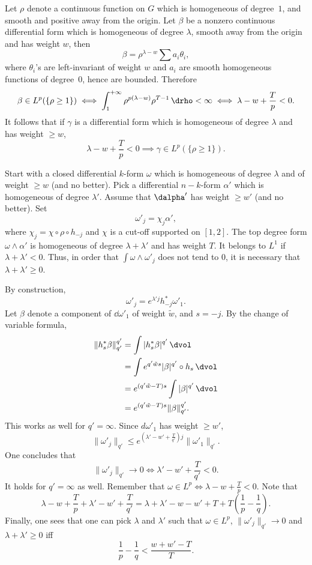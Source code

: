 Let $\rho$ denote a continuous function on $G$ which is homogeneous of degree~$1$, and smooth and positive away from the origin. Let $\beta$ be a nonzero continuous differential form which is homogeneous of degree $\lambda$, smooth away from the origin and has weight $w$, then
\[
\beta=\rho^{\lambda-w}\sum a_i\theta_i,
\]
where $\theta_i$'s are left-invariant of weight $w$ and $a_i$ are smooth homogeneous functions of degree~$0$, hence are bounded. Therefore
\[
\beta\in L^p(\{\rho\geq 1\}) \iff
\int_{1}^{+\infty}\rho^{p(\lambda-w)}\rho^{T-1}\, \drho<\infty
\iff \lambda-w +\frac{T}{p}<0.
\]
It follows that if $\gamma$ is a differential form which is homogeneous of degree $\lambda$ and has weight $\geq w$,
\begin{equation}\label{eq:16}
\lambda-w +\frac{T}{p}<0 \implies \gamma\in L^p(\{\rho\geq 1\}).
\end{equation}

Start with a closed differential $k$-form $\omega$ which is homogeneous of degree $\lambda$ and of weight $\geq w$ (and no better). Pick a differential $n-k$-form $\alpha'$ which is homogeneous of degree $\lambda'$. Assume that $\dalpha'$ has weight $\geq w'$ (and no better). Set
\[
\omega'_j=\chi_j \alpha',
\]
where $\chi_j=\chi\circ\rho\circ h_{-j}$ and $\chi$ is a cut-off supported on $[1,2]$. The top degree form $\omega\wedge \alpha'$ is homogeneous of degree $\lambda+\lambda'$ and has weight $T$. It belongs to $L^1$ if $\lambda+\lambda'<0$. Thus, in order that $\int\omega\wedge \omega'_j$ does not tend to $0$, it is necessary that $\lambda+\lambda'\geq 0$.

By construction,
\[
\omega'_j=e^{\lambda'j} h_{-j}^*\omega'_1.
\]
Let $\beta$ denote a component of $\dd\omega'_1$ of weight $\tilde w$, and $s=-j$. By the change of variable formula,
\begin{align*}
\| h_s^*\beta\|_{q'}^{q'} &= \int | h_s^*\beta|^{q'}\,\dvol\\
&= \int e^{q'{\tilde w}s}|\beta|^{q'}\circ h_s\,\dvol\\
&= e^{(q'{\tilde w}-T)s}\int |\beta|^{q'}\,\dvol\\
&= e^{(q'{\tilde w}-T)s}\|\beta\|_{q'}^{q'}.
\end{align*}
This works as well for $q'=\infty$. Since $d\omega'_1$ has weight $\geq w'$,
\[
\|\omega'_j\|_{q'}\leq e^{(\lambda'-w'+\frac{T}{q'})j}\|\omega'_1\|_{q'}.
\]
One concludes that
\[
\|\omega'_j\|_{q'}\to 0 \iff \lambda'-w'+\frac{T}{q'}<0.
\]
It holds for $q'=\infty$ as well. Remember that $\omega\in L^p \iff \lambda-w+\frac{T}{p}<0$. Note that
\[
\lambda-w+\frac{T}{p}+\lambda'-w'+\frac{T}{q'} =\lambda+\lambda'-w-w'+T+T\left(\frac{1}{p}-\frac{1}{q}\right).
\]
Finally, one sees that one can pick $\lambda$ and $\lambda'$ such that $\omega\in L^p$, $\|\omega'_j\|_{q'}\to 0$ and $\lambda+\lambda'\geq 0$ iff
\begin{equation}\label{eq:17}
\frac{1}{p}-\frac{1}{q}<\frac{w+w'-T}{T}.
\end{equation}

